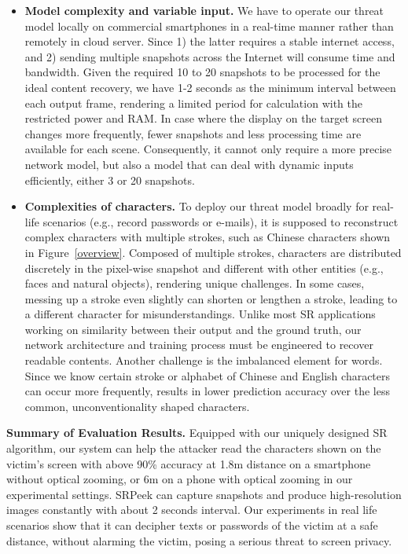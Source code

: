 \begin{itemize}[leftmargin=*]
  \item \textbf{Model complexity and variable input.} We have to operate our threat model locally on commercial smartphones in a real-time manner rather than remotely in cloud server. Since 1) the latter requires a stable internet access, and 2) sending multiple snapshots across the Internet will consume time and bandwidth. Given the required 10 to 20 snapshots to be processed for the ideal content recovery, we have 1-2 seconds as the minimum interval between each output frame, rendering a limited period for calculation with the restricted power and RAM. In case where the display on the target screen changes more frequently, fewer snapshots and less processing time are available for each scene. Consequently, it cannot only require a more precise network model, but also a model that can deal with dynamic inputs efficiently, either 3 or 20 snapshots.
  \item \textbf{Complexities of characters.} To deploy our threat model broadly for real-life scenarios (e.g., record passwords or e-mails), it is supposed to reconstruct complex characters with multiple strokes, such as Chinese characters shown in Figure~\ref{overview}. Composed of multiple strokes, characters are distributed discretely in the pixel-wise snapshot and different with other entities (e.g., faces and natural objects), rendering unique challenges. In some cases, messing up a stroke even slightly can shorten or lengthen a stroke, leading to a different character for misunderstandings. Unlike most SR applications working on similarity between their output and the ground truth, our network architecture and training process must be engineered to recover readable contents. Another challenge is the imbalanced element for words. Since we know certain stroke or alphabet of Chinese and English characters can occur more frequently, results in lower prediction accuracy over the less common, unconventionality shaped characters.
\end{itemize}

\vspace{1mm}
\noindent
\textbf{Summary of Evaluation Results.}
Equipped with our uniquely designed SR algorithm, our system can help the attacker read the characters shown on the victim's screen with above 90\% accuracy at 1.8m distance on a smartphone without optical zooming, or 6m on a phone with optical zooming in our experimental settings. \textsf{SRPeek} can capture snapshots and produce high-resolution images constantly with about 2 seconds interval. Our experiments in real life scenarios show that it can decipher texts or passwords of the victim at a safe distance, without alarming the victim, posing a serious threat to screen privacy.

